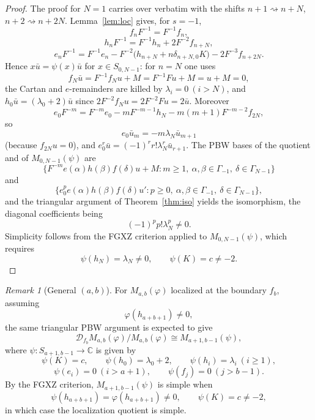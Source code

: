 \documentclass[11pt]{article}
\newcommand{\C}{\mathbb C}
\newcommand{\G}{\Gamma}
\newcommand{\D}{\mathcal D}
\theoremstyle{plain}
\theoremstyle{remark}
\newtheorem{remark}[lemma]{Remark}
\begin{document}
\begin{proof}
The proof for \(N=1\) carries over verbatim with the shifts
\(n+1\rightsquigarrow n+N\), \(n+2\rightsquigarrow n+2N\). Lemma~\ref{lem:loc}
gives, for \(s=-1\),
\[
  f_nF^{-1}=F^{-1}f_n,
\]
\[
  h_nF^{-1}=F^{-1}h_n+2F^{-2}f_{n+N},
\]
\[
  e_nF^{-1}
  =
  F^{-1}e_n
  -F^{-2}\bigl(h_{n+N}+n\delta_{n+N,0}K\bigr)
  -2F^{-3}f_{n+2N}.
\]
Hence \(x\bar u=\psi(x)\bar u\) for \(x\in S_{0,N-1}\): for \(n=N\) one uses
\[
  f_N\bar u=F^{-1}f_Nu+M=F^{-1}Fu+M=u+M=0,
\]
the Cartan and \(e\)-remainders are killed by \(\lambda_i=0\ (i>N)\), and
\(h_0\bar u=(\lambda_0+2)\bar u\) since \(2F^{-2}f_Nu=2F^{-2}Fu=2\bar u\).
Moreover
\[
  e_0F^{-m}=F^{-m}e_0-mF^{-m-1}h_N-m(m+1)F^{-m-2}f_{2N},
\]
so
\[
  e_0\bar u_m=-m\lambda_N\bar u_{m+1}
\]
(because \(f_{2N}u=0\)), and \(e_0^r\bar u=(-1)^rr!\lambda_N^r\bar u_{r+1}\).
The PBW bases of the quotient and of \(M_{0,N-1}(\psi)\) are
\[
  \{F^{-m}e(\alpha)h(\beta)f(\delta)u+M:
  m\ge1,\ \alpha,\beta\in\G_{-1},\ \delta\in\G_{N-1}\}
\]
and
\[
  \{e_0^pe(\alpha)h(\beta)f(\delta)u':
  p\ge0,\ \alpha,\beta\in\G_{-1},\ \delta\in\G_{N-1}\},
\]
and the triangular argument of Theorem~\ref{thm:iso} yields the isomorphism,
the diagonal coefficients being
\[
  (-1)^pp!\lambda_N^p\ne0.
\]
Simplicity follows from the FGXZ criterion applied to \(M_{0,N-1}(\psi)\), which
requires
\[
  \psi(h_N)=\lambda_N\ne0,\qquad \psi(K)=c\ne-2.
\]
\end{proof}

\begin{remark}[General \((a,b)\)]
For \(M_{a,b}(\varphi)\) localized at the boundary \(f_b\), assuming
\[
  \varphi(h_{a+b+1})\ne0,
\]
the same triangular PBW argument is expected to give
\[
  \D_{f_b}M_{a,b}(\varphi)/M_{a,b}(\varphi)
  \cong
  M_{a+1,b-1}(\psi),
\]
where \(\psi:S_{a+1,b-1}\to\C\) is given by
\[
  \psi(K)=c,\qquad
  \psi(h_0)=\lambda_0+2,\qquad
  \psi(h_i)=\lambda_i\ (i\ge1),
\]
\[
  \psi(e_i)=0\ (i>a+1),\qquad \psi(f_j)=0\ (j>b-1).
\]
By the FGXZ criterion, \(M_{a+1,b-1}(\psi)\) is simple when
\[
  \psi(h_{a+b+1})=\varphi(h_{a+b+1})\ne0,\qquad \psi(K)=c\ne-2,
\]
in which case the localization quotient is simple.
\end{remark}
\end{document}
